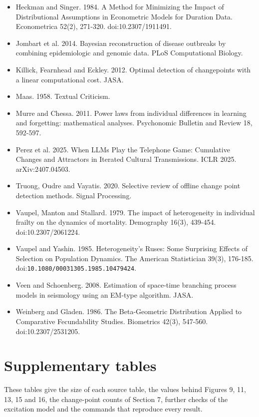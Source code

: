 \documentclass{arxivtmpl}
\begin{document}
\begin{itemize}[leftmargin=1.5em, itemsep=1pt, parsep=0pt, label={}]
\item Heckman and Singer. 1984. A Method for Minimizing the Impact of Distributional Assumptions in Econometric Models for Duration Data. Econometrica 52(2), 271-320. doi:10.2307/1911491.
\item Jombart et al. 2014. Bayesian reconstruction of disease outbreaks by combining epidemiologic and genomic data. PLoS Computational Biology.
\item Killick, Fearnhead and Eckley. 2012. Optimal detection of changepoints with a linear computational cost. JASA.
\item Maas. 1958. Textual Criticism.
\item Murre and Chessa. 2011. Power laws from individual differences in learning and forgetting: mathematical analyses. Psychonomic Bulletin and Review 18, 592-597.
\item Perez et al. 2025. When LLMs Play the Telephone Game: Cumulative Changes and Attractors in Iterated Cultural Transmissions. ICLR 2025. arXiv:2407.04503.
\item Truong, Oudre and Vayatis. 2020. Selective review of offline change point detection methods. Signal Processing.
\item Vaupel, Manton and Stallard. 1979. The impact of heterogeneity in individual frailty on the dynamics of mortality. Demography 16(3), 439-454. doi:10.2307/2061224.
\item Vaupel and Yashin. 1985. Heterogeneity's Ruses: Some Surprising Effects of Selection on Population Dynamics. The American Statistician 39(3), 176-185. doi:\texttt{10.\allowbreak{}1080/\allowbreak{}00031305.\allowbreak{}1985.\allowbreak{}10479424}.
\item Veen and Schoenberg. 2008. Estimation of space-time branching process models in seismology using an EM-type algorithm. JASA.
\item Weinberg and Gladen. 1986. The Beta-Geometric Distribution Applied to Comparative Fecundability Studies. Biometrics 42(3), 547-560. doi:10.2307/2531205.
\end{itemize}

\appendix
\section{Supplementary tables}
\renewcommand{\thetable}{A\arabic{table}}\setcounter{table}{0}

These tables give the size of each source table, the values behind Figures 9, 11, 13, 15 and 16, the change-point counts of Section 7, further checks of the excitation model and the commands that reproduce every result.
\end{document}
